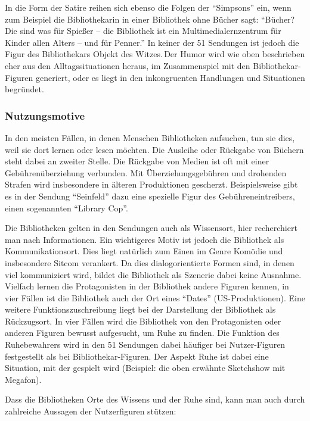 In die Form der Satire reihen sich ebenso die Folgen der
\enquote{Simpsons} ein, wenn zum Beispiel die Bibliothekarin in einer
Bibliothek ohne Bücher sagt: \enquote{Bücher? Die sind was für Spießer
-- die Bibliothek ist ein Multimedialernzentrum für Kinder allen Alters
-- und für Penner.} In keiner der 51 Sendungen ist jedoch die Figur des
Bibliothekars Objekt des Witzes.\,Der Humor wird wie oben beschrieben
eher aus den Alltagssituationen heraus, im Zusammenspiel mit den
Bibliothekar-Figuren generiert, oder es liegt in den inkongruenten
Handlungen und Situationen begründet.

\subsubsection{Nutzungsmotive}\label{nutzungsmotive}

In den meisten Fällen, in denen Menschen Bibliotheken aufsuchen, tun sie
dies, weil sie dort lernen oder lesen möchten. Die Ausleihe oder
Rückgabe von Büchern steht dabei an zweiter Stelle. Die Rückgabe von
Medien ist oft mit einer Gebührenüberziehung verbunden. Mit
Überziehungsgebühren und drohenden Strafen wird insbesondere in älteren
Produktionen gescherzt. Beispielsweise gibt es in der Sendung
\enquote{Seinfeld} dazu eine spezielle Figur des Gebühreneintreibers,
einen sogenannten \enquote{Library Cop}.

Die Bibliotheken gelten in den Sendungen auch als Wissensort, hier
recherchiert man nach Informationen. Ein wichtigeres Motiv ist jedoch
die Bibliothek als Kommunikationsort. Dies liegt natürlich zum Einen im
Genre Komödie und insbesondere Sitcom verankert. Da dies
dialogorientierte Formen sind, in denen viel kommuniziert wird, bildet
die Bibliothek als Szenerie dabei keine Ausnahme. Vielfach lernen die
Protagonisten in der Bibliothek andere Figuren kennen, in vier Fällen
ist die Bibliothek auch der Ort eines \enquote{Dates} (US-Produktionen).
Eine weitere Funktionszuschreibung liegt bei der Darstellung der
Bibliothek als Rückzugsort. In vier Fällen wird die Bibliothek von den
Protagonisten oder anderen Figuren bewusst aufgesucht, um Ruhe zu
finden. Die Funktion des Ruhebewahrers wird in den 51
Sendungen dabei häufiger bei Nutzer-Figuren festgestellt als bei
Bibliothekar-Figuren. Der Aspekt Ruhe ist dabei eine Situation, mit der
gespielt wird (Beispiel: die oben erwähnte Sketchshow mit Megafon).

Dass die Bibliotheken Orte des Wissens und der Ruhe sind, kann man auch
durch zahlreiche Aussagen der Nutzerfiguren stützen:

